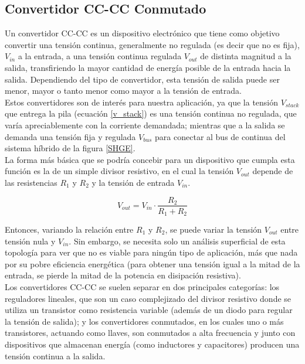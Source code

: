 \subsection{Convertidor CC-CC Conmutado}

Un convertidor CC-CC es un dispositivo electrónico que tiene como objetivo convertir una tensión continua, generalmente no regulada (es decir que no es fija), $V_{in}$ a la entrada, a una tensión continua regulada $V_{out}$ de distinta magnitud a la salida, transfiriendo la mayor cantidad de energía posible de la entrada hacia la salida. Dependiendo del tipo de convertidor, esta tensión de salida puede ser menor, mayor o tanto menor como mayor a la tensión de entrada.\\

Estos convertidores son de interés para nuestra aplicación, ya que la tensión $V_{stack}$ que entrega la pila (ecuación \ref{v_stack}) es una tensión continua no regulada, que varía apreciablemente con la corriente demandada; mientras que a la salida se demanda una tensión fija y regulada $V_{bus}$ para conectar al bus de continua del sistema híbrido de la figura \ref{SHGE}.\\

La forma más básica que se podría concebir para un dispositivo que cumpla esta función es la de un simple divisor resistivo, en el cual la tensión $V_{out}$ depende de las resistencias $R_1$ y $R_2$ y la tensión de entrada $V_{in}$.

\begin{equation*}
    V_{out} = V_{in}\cdot\frac{R_2}{R_1+R_2}
\end{equation*}

Entonces, variando la relación entre $R_1$ y $R_2$, se puede variar la tensión $V_{out}$ entre tensión nula y $V_{in}$. Sin embargo, se necesita solo un análisis superficial de esta topología para ver que no es viable para ningún tipo de aplicación, más que nada por su pobre eficiencia energética (para obtener una tensión igual a la mitad de la entrada, se pierde la mitad de la potencia en disipación resistiva).\\

Los convertidores CC-CC se suelen separar en dos principales categorías: los {\Medium reguladores lineales}, que son un caso complejizado del divisor resistivo donde se utiliza un transistor como resistencia variable (además de un diodo para regular la tensión de salida); y los {\Medium convertidores conmutados}, en los cuales uno o más transistores, actuando como llaves, son conmutados a alta frecuencia y junto con dispositivos que almacenan energía (como inductores y capacitores) producen una tensión continua a la salida.\\

